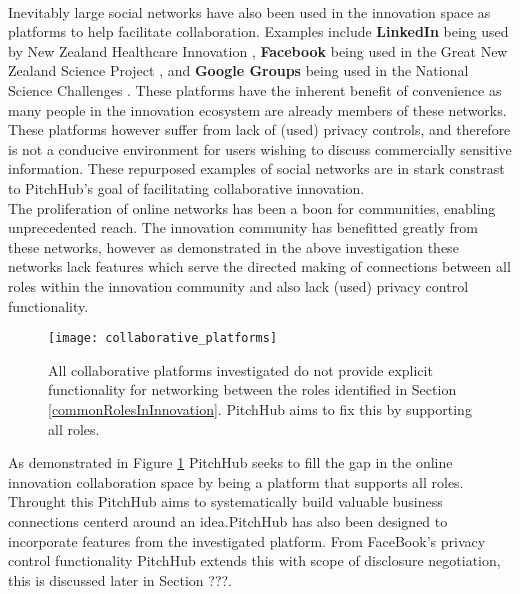 \\
\newline
Inevitably large social networks have also been used in the innovation space as platforms to help facilitate collaboration. Examples include \textbf{LinkedIn} \cite{Linkedin:online} being used by New Zealand Healthcare Innovation \cite{nzHealthCare:online}, \textbf{Facebook} \cite{Faceb6:online} being used in the Great New Zealand Science Project \cite{greatNZScience:online}, and \textbf{Google Groups} \cite{Googlegroups:online} being used in the National Science Challenges \cite{nzNSC10:online}. These platforms have the inherent benefit of convenience as many people in the innovation ecosystem are already members of these networks. These platforms however suffer from lack of (used) privacy controls, and therefore is not a conducive environment for users wishing to discuss commercially sensitive information. These repurposed examples of social networks are in stark constrast to PitchHub's goal of facilitating collaborative innovation.
\\
\newline
The proliferation of online networks has been a boon for communities, enabling unprecedented reach. The innovation community has benefitted greatly from these networks, however as demonstrated in the above investigation these networks lack features which serve the directed making of connections between all roles within the innovation community and also lack (used) privacy control functionality.

\begin{figure}[ht]
    \centering
    \texttt{[image: collaborative\_platforms]}
    \caption{All collaborative platforms investigated do not provide explicit functionality for networking between the roles identified in Section \ref{commonRolesInInnovation}. PitchHub aims to fix this by supporting all roles. }
    \label{fig:collaborative_platforms}
\end{figure}

As demonstrated in Figure \ref{fig:collaborative_platforms} PitchHub seeks to fill the gap in the online innovation collaboration space by being a platform that supports all roles. Throught this PitchHub aims to systematically build valuable business connections centerd around an idea.PitchHub has also been designed to incorporate features from the investigated platform. From FaceBook's privacy control functionality PitchHub extends this with scope of disclosure negotiation, this is discussed later in Section ???.


